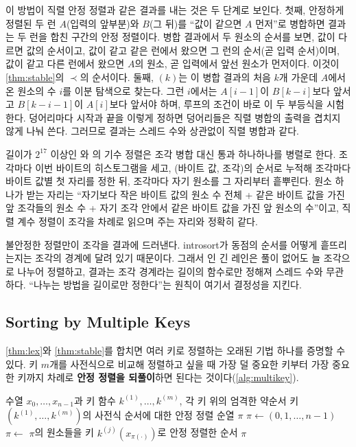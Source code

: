 이 방법이 직렬 안정 정렬과 같은 결과를 내는 것은 두 단계로 보인다. 첫째, 안정하게 정렬된 두 런 $A$(입력의 앞부분)와 $B$(그 뒤)를 ``값이 같으면 $A$ 먼저''로 병합하면 결과는 두 런을 합친 구간의 안정 정렬이다. 병합 결과에서 두 원소의 순서를 보면, 값이 다르면 값의 순서이고, 값이 같고 같은 런에서 왔으면 그 런의 순서(곧 입력 순서)이며, 값이 같고 다른 런에서 왔으면 $A$의 원소, 곧 입력에서 앞선 원소가 먼저이다. 이것이 \cref{thm:stable}의 $\prec$의 순서이다. 둘째, $(k)$는 이 병합 결과의 처음 $k$개 가운데 $A$에서 온 원소의 수 $i$를 이분 탐색으로 찾는다. 그런 $i$에서는 $A[i-1]$이 $B[k-i]$보다 앞서고 $B[k-i-1]$이 $A[i]$보다 앞서야 하며, 루프의 조건이 바로 이 두 부등식을 시험한다. 덩어리마다 시작과 끝을 이렇게 정하면 덩어리들은 직렬 병합의 출력을 겹치지 않게 나눠 쓴다. 그러므로 결과는 스레드 수와 상관없이 직렬 병합과 같다.

길이가 $2^{17}$ 이상인 와 의 기수 정렬은 조각 병합 대신 통과 하나하나를 병렬로 한다. 조각마다 이번 바이트의 히스토그램을 세고, (바이트 값, 조각)의 순서로 누적해 조각마다 바이트 값별 첫 자리를 정한 뒤, 조각마다 자기 원소를 그 자리부터 흩뿌린다. 원소 하나가 받는 자리는 ``자기보다 작은 바이트 값의 원소 수 전체 + 같은 바이트 값을 가진 앞 조각들의 원소 수 + 자기 조각 안에서 같은 바이트 값을 가진 앞 원소의 수''이고, 직렬 계수 정렬이 조각을 차례로 읽으며 주는 자리와 정확히 같다.

불안정한 정렬만이 조각을 결과에 드러낸다. introsort가 동점의 순서를 어떻게 흩뜨리는지는 조각의 경계에 달려 있기 때문이다. 그래서 인 긴 레인은 풀이 없어도 늘 조각으로 나누어 정렬하고, 결과는 조각 경계라는 길이의 함수로만 정해져 스레드 수와 무관하다. ``나누는 방법을 길이로만 정한다''는 원칙이 여기서 결정성을 지킨다.

\subsection{Sorting by Multiple Keys}

\cref{thm:lex}와 \cref{thm:stable}를 합치면 여러 키로 정렬하는 오래된 기법 하나를 증명할 수 있다. 키 $m$개를 사전식으로 비교해 정렬하고 싶을 때 가장 덜 중요한 키부터 가장 중요한 키까지 차례로 \textbf{안정 정렬을 되풀이}하면 된다는 것이다(\cref{alg:multikey}).

\begin{algorithm}[htbp]
\begin{algorithmic}[1]
\Require 수열 $x_0,\dots,x_{n-1}$과 키 함수 $k^{(1)},\dots,k^{(m)}$, 각 키 위의 엄격한 약순서
\Ensure 키 $(k^{(1)},\dots,k^{(m)})$의 사전식 순서에 대한 안정 정렬 순열 $\pi$
\State $\pi\gets(0,1,\dots,n-1)$ 
  \State $\pi\gets$ $\pi$의 원소들을 키 $k^{(j)}(x_{\pi(\cdot)})$로 안정 정렬한 순서
\EndFor
\State \Return $\pi$
\end{algorithmic}
\caption{덜 중요한 키부터 되풀이하는 안정 정렬}
\label{alg:multikey}
\end{algorithm}

